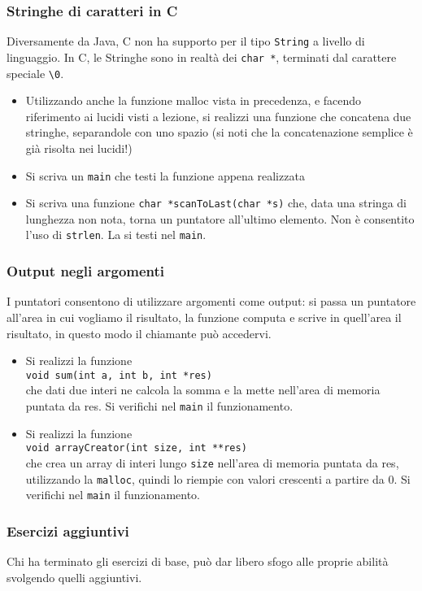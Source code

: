 \documentclass{beamer}
\begin{document}
\begin{frame}
\frametitle{Stringhe di caratteri in C}
Diversamente da Java, C non ha supporto per il tipo \texttt{String} a livello di linguaggio. In C, le Stringhe sono in realtà dei \texttt{char *}, terminati dal carattere speciale \texttt{\textbackslash{}0}.
\begin{itemize}
 \item Utilizzando anche la funzione malloc vista in precedenza, e facendo riferimento ai lucidi visti a lezione, si realizzi una funzione che concatena due stringhe, separandole con uno spazio (si noti che la concatenazione semplice è già risolta nei lucidi!)
 \item Si scriva un \texttt{main} che testi la funzione appena realizzata
 \item Si scriva una funzione \texttt{char *scanToLast(char *s)} che, data una stringa di lunghezza non nota, torna un puntatore all'ultimo elemento. Non è consentito l'uso di \texttt{strlen}. La si testi nel \texttt{main}.
\end{itemize}
\end{frame}

\begin{frame}
\frametitle{Output negli argomenti}
I puntatori consentono di utilizzare argomenti come output: si passa un puntatore all'area in cui vogliamo il risultato, la funzione computa e scrive in quell'area il risultato, in questo modo il chiamante può accedervi.
\begin{itemize}
 \item Si realizzi la funzione\\ \texttt{void sum(int a, int b, int *res)} \\che dati due interi ne calcola la somma e la mette nell'area di memoria puntata da res. Si verifichi nel \texttt{main} il funzionamento.
 \item Si realizzi la funzione\\ \texttt{void arrayCreator(int size, int **res)} \\che crea un array di interi lungo \texttt{size} nell'area di memoria puntata da res, utilizzando la \texttt{malloc}, quindi lo riempie con valori crescenti a partire da 0. Si verifichi nel \texttt{main} il funzionamento.
\end{itemize}
\end{frame}

\begin{frame}
\frametitle{Esercizi aggiuntivi}
Chi ha terminato gli esercizi di base, può dar libero sfogo alle proprie abilità svolgendo quelli aggiuntivi.
\end{frame}
\end{document}
